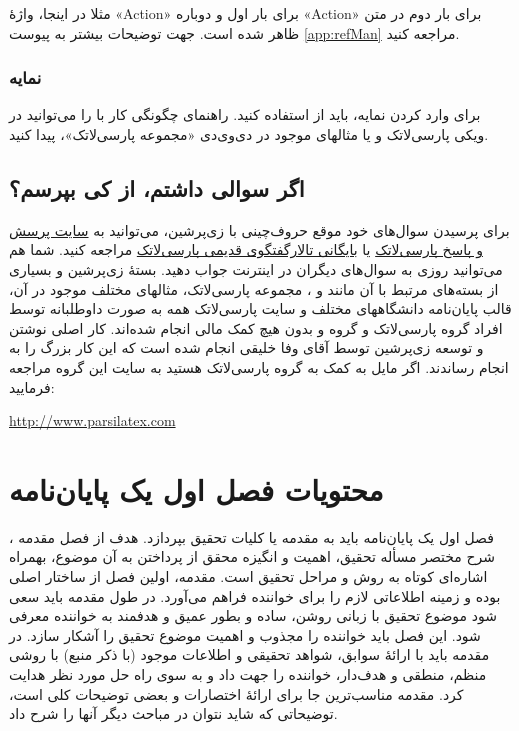مثلا در اینجا، واژهٔ
«\gls{Action}»
برای بار اول و دوباره
«\gls{Action}»
برای بار دوم در متن ظاهر شده است.
جهت توضیحات بیشتر به پیوست
\ref{app:refMan}
مراجعه کنید.
\subsubsection{نمایه}
برای وارد کردن نمایه، باید از
استفاده کنید.
راهنمای چگونگی کار با
را می‌توانید در ویکی پارسی‌لاتک و یا مثالهای موجود در دی‌وی‌دی «مجموعه پارسی‌لاتک»، پیدا کنید.

\subsection{اگر سوالی داشتم، از کی بپرسم؟}
برای پرسیدن سوال‌های خود موقع حروف‌چینی با زی‌پرشین، می‌توانید به
\href{http://qa.parsilatex.com}{سایت پرسش و پاسخ پارسی‌لاتک}%
یا
\href{http://forum.parsilatex.com}{بایگانی تالارگفتگوی قدیمی پارسی‌لاتک}%
مراجعه کنید. شما هم می‌توانید روزی به سوال‌های دیگران در اینترنت جواب دهید.
بستهٔ زی‌پرشین و بسیاری از بسته‌های مرتبط با آن مانند
 و
،
مجموعه پارسی‌لاتک، مثالهای مختلف موجود در آن، قالب پایان‌نامه دانشگاههای مختلف و سایت پارسی‌لاتک همه به صورت داوطلبانه توسط افراد گروه پارسی‌لاتک و گروه
و بدون هیچ کمک مالی انجام شده‌اند. کار اصلی نوشتن و توسعه زی‌پرشین توسط آقای وفا خلیقی انجام شده است که این کار بزرگ را به انجام رساندند.
اگر مایل به کمک به گروه پارسی‌لاتک هستید به سایت این گروه مراجعه فرمایید:
\begin{center}
	\url{http://www.parsilatex.com}
\end{center}

\section{محتویات فصل اول یک پایان‌نامه}
فصل اول یک پایان‌نامه باید به مقدمه یا کلیات تحقیق بپردازد.
هدف از فصل مقدمه%
،
شرح مختصر مسأله تحقیق، اهمیت و انگیزه محقق از پرداختن به آن موضوع، بهمراه اشاره‌ای کوتاه به روش و مراحل تحقیق است. مقدمه، اولین فصل از ساختار اصلی \پ بوده و زمینه اطلاعاتی لازم را برای خواننده فراهم می‌آورد. در طول مقدمه باید سعی شود موضوع تحقیق با زبانی روشن، ساده و بطور عمیق و هدفمند به خواننده معرفی شود. این فصل باید خواننده را مجذوب و اهمیت موضوع تحقیق را آشکار سازد. در مقدمه باید با ارائهٔ سوابق، شواهد تحقیقی و اطلاعات موجود (با ذکر منبع) با روشی منظم، منطقی و هدف‌دار، خواننده را جهت داد و به سوی راه حل مورد نظر هدایت کرد. مقدمه مناسب‌ترین جا برای ارائهٔ اختصارات و بعضی توضیحات کلی است، توضیحاتی که شاید نتوان در مباحث دیگر آنها را شرح داد.

